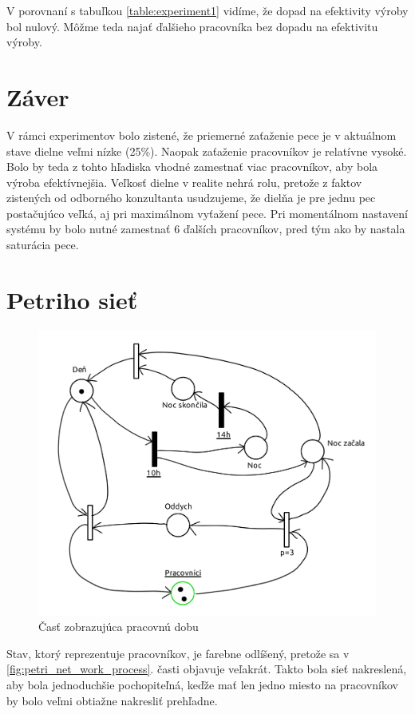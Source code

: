 \documentclass[11pt,a4paper]{article}
\begin{document}
V porovnaní s tabuľkou \ref{table:experiment1} vidíme, že dopad na efektivity výroby bol nulový. Môžme teda najať ďalšieho pracovníka bez dopadu na efektivitu výroby.

\section{Záver}
V rámci experimentov bolo zistené, že priemerné zaťaženie pece je v aktuálnom stave dielne veľmi nízke (25\%). Naopak zaťaženie pracovníkov je relatívne vysoké. Bolo by teda z tohto hľadiska vhodné zamestnať viac pracovníkov, aby bola výroba efektívnejšia. Veľkosť dielne v realite nehrá rolu, pretože z faktov zistených od odborného konzultanta usudzujeme, že dielňa je pre jednu pec postačujúco veľká, aj pri maximálnom vyťažení pece. Pri momentálnom nastavení systému by bolo nutné zamestnať 6 ďalších pracovníkov, pred tým ako by nastala saturácia pece.

\clearpage

\renewcommand{\refname}{Literatúra}


\clearpage
\appendix
\section{Petriho sieť}
\label{appendix:petri_net}

\begin{figure}[ht]
    \centering
    \includegraphics[scale=0.8]{ims_den-noc_cyklus.png}
    \caption{Časť zobrazujúca pracovnú dobu}
    \label{fig:petri_net_worktime}
\end{figure}
Stav, ktorý reprezentuje pracovníkov, je farebne odlíšený, pretože sa v \ref{fig:petri_net_work_process}. časti objavuje veľakrát. Takto bola sieť nakreslená, aby bola jednoduchšie pochopiteľná, keďže mať len jedno miesto na pracovníkov by bolo veľmi obtiažne nakresliť prehľadne.
\end{document}
